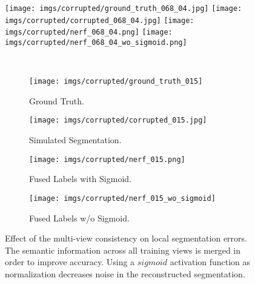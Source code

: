 \begin{figure*}[t]
	\centering
	
	\begin{minipage}{0.035\linewidth}
		\centering
	\end{minipage}
	\begin{minipage}{0.95\linewidth}
		\centering
		\hspace{-0.13cm}
		\texttt{[image: imgs/corrupted/ground\_truth\_068\_04.jpg]}
		\hfil
		\texttt{[image: imgs/corrupted/corrupted\_068\_04.jpg]}
		\hfil
		\texttt{[image: imgs/corrupted/nerf\_068\_04.png]}
		\hfil
		\texttt{[image: imgs/corrupted/nerf\_068\_04\_wo\_sigmoid.png]}
	\end{minipage}
	\\
	\vspace{0.2cm}
	\begin{minipage}{0.04\linewidth}
		\centering
	\end{minipage}
	\begin{minipage}{0.95\linewidth}
		\begin{subfigure}{0.24\textwidth}
			\centering
			\texttt{[image: imgs/corrupted/ground\_truth\_015]}
			\caption{Ground Truth.}
			\label{subfig:lbl_corruption_gt}
		\end{subfigure}
		\hfil
		\begin{subfigure}{0.24\textwidth}
			\centering
			\texttt{[image: imgs/corrupted/corrupted\_015.jpg]}
			\caption{Simulated Segmentation.}
			\label{subfig:lbl_corruption_corrupted}
		\end{subfigure}
		\hfil
		\begin{subfigure}{0.24\textwidth}
			\centering
			\texttt{[image: imgs/corrupted/nerf\_015.png]}
			\caption{Fused Labels with Sigmoid.}
			\label{subfig:lbl_corruption_nerf_output}
		\end{subfigure}
		\hfil
		\begin{subfigure}{0.24\textwidth}
			\centering
			\texttt{[image: imgs/corrupted/nerf\_015\_wo\_sigmoid]}
			\caption{Fused Labels w/o Sigmoid.}
			\label{subfig:lbl_corruption_nerf_output_no_activation}
		\end{subfigure}
	\end{minipage}
	\caption{Effect of the multi-view consistency on local segmentation errors.  
		The semantic information across all training views is merged in order to improve accuracy.
		Using a $\mathit{sigmoid}$ activation function as normalization 	decreases noise in the reconstructed segmentation. }
	\label{fig:s_nerf_shading}
\end{figure*}


